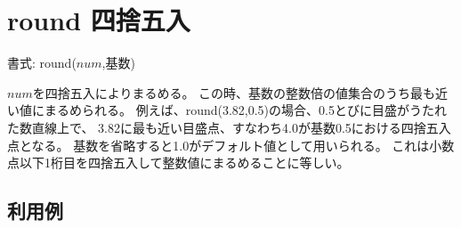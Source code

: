 
%

\section{round 四捨五入\label{sect:round}}

書式: round($num$,基数)

$num$を四捨五入によりまるめる。
この時、基数の整数倍の値集合のうち最も近い値にまるめられる。
例えば、round(3.82,0.5)の場合、0.5とびに目盛がうたれた数直線上で、
3.82に最も近い目盛点、すなわち4.0が基数0.5における四捨五入点となる。
基数を省略すると1.0がデフォルト値として用いられる。
これは小数点以下1桁目を四捨五入して整数値にまるめることに等しい。

\subsection*{利用例}


%

